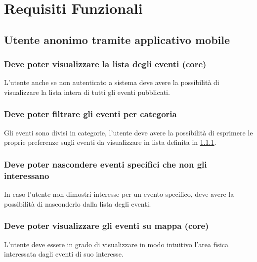 \documentclass{article}
\begin{document}
\section{Requisiti Funzionali}

\subsection{Utente anonimo tramite applicativo mobile}

\subsubsection{Deve poter visualizzare la lista degli eventi (core)}\label{Requirements:Lista}
\label{5.1.1}
L'utente anche se non autenticato a sistema deve avere la possibilità di visualizzare la lista intera di tutti gli eventi pubblicati.

\subsubsection{Deve poter filtrare gli eventi per categoria}
\label{5.1.2}
Gli eventi sono divisi in categorie, l'utente deve avere la possibilità di esprimere le proprie preferenze sugli eventi da visualizzare in lista definita in \ref{Requirements:Lista}.

\subsubsection{Deve poter nascondere eventi specifici che non gli interessano}
\label{5.1.3}
In caso l'utente non dimostri interesse per un evento specifico, deve avere la possibilità di nasconderlo dalla lista degli eventi.

\subsubsection{Deve poter visualizzare gli eventi su mappa (core)}
\label{5.1.4}
L'utente deve essere in grado di visualizzare in modo intuitivo l'area fisica interessata dagli eventi di suo interesse. 
\end{document}
